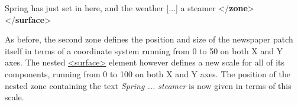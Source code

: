 \begin{shaded}
\mbox{}\newline 
{}\mbox{}\newline 
\hspace*{1em}\mbox{}\newline 
\hspace*{1em}\hspace*{1em} Spring has just set in here, and the\mbox{}\newline 
\hspace*{1em}\hspace*{1em}\hspace*{1em}\hspace*{1em}\hspace*{1em}\hspace*{1em} weather [...] a steamer {</\textbf{zone}>}\mbox{}\newline 
\hspace*{1em}\mbox{}\newline 
{}\mbox{}\newline 
{</\textbf{surface}>}\end{shaded}\egroup\par \noindent  As before, the second zone defines the position and size of the newspaper patch itself in terms of a coordinate system running from 0 to 50 on both X and Y axes. The nested \hyperref[TEI.surface]{<surface>} element however defines a new scale for all of its components, running from 0 to 100 on both X and Y axes. The position of the nested zone containing the text \textit{Spring ... steamer} is now given in terms of this scale.\par
